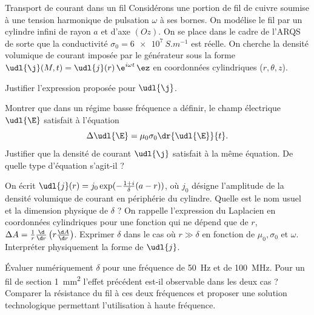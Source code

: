 \begin{exo}[PC][1][colle]{Transport de courant dans un fil}
Considérons une portion de fil de cuivre soumise à une tension harmonique de pulsation $\omega$ à ses bornes. On modélise le fil par un cylindre infini de rayon $a$ et d'axe $(Oz)$. On se place dans le cadre de l'ARQS de sorte que la conductivité $\sigma_0 = \SI{6e7}{S.m^{-1}}$ est réelle. On cherche la densité volumique de courant imposée par le générateur sous la forme $\udl{\j}(M,t)= \udl{j}(r)\,\e^{i\omega t}\,\ez$ en coordonnées cylindriques ($r,\theta,z$).
\begin{quest}
\item Justifier l'expression proposée pour $\udl{\j}$.
\item Montrer que dans un régime basse fréquence a définir, le champ électrique $\udl{\E}$ satisfait à l'équation
$$
\Delta \udl{\E} = \mu_0\sigma_0\dr{\udl{\E}}{t}.
$$
Justifier que la densité de courant $\udl{\j}$ satisfait à la même équation. De quelle type d’équation s’agit-il ?
\item On écrit $\udl{j}(r) = j_0 \exp(-\frac{1+i}{\delta}(a-r))$,
où $j_0$ désigne l'amplitude de la densité volumique de courant en périphérie du cylindre.
Quelle est le nom usuel et la dimension physique de $\delta$ ?
On rappelle l'expression du Laplacien en coordonnées cylindriques pour une fonction qui ne dépend que de $r$, $\Delta A=\frac{1}{r}\frac{\d}{\d r}\left(r\frac{\d A}{\d r}\right)$. Exprimer $\delta$ dans le cas où $r\gg\delta$ en fonction de $\mu_0,\sigma_0$ et $\omega$. Interpréter physiquement la forme de $\udl{j}$.
\item Évaluer numériquement $\delta$ pour une fréquence de \SI{50}{Hz} et de \SI{100}{MHz}. Pour un fil de section \SI{1}{mm^2} l'effet précédent est-il observable dans les deux cas ? Comparer la résistance du fil à ces deux fréquences et proposer une solution technologique permettant l'utilisation à haute fréquence.
\end{quest}
\end{exo}
